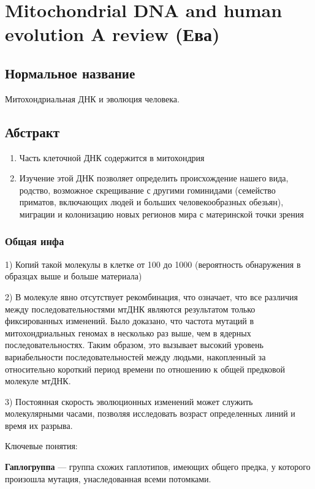 \section{Mitochondrial DNA and human evolution A review (Ева)}

\subsection{Нормальное название}

Митохондриальная ДНК и эволюция человека.

\subsection{Абстракт}

\begin{enumerate}
	\item Часть клеточной ДНК содержится в митохондрия 
	
	\item Изучение этой ДНК позволяет определить происхождение нашего вида, родство, возможное скрещивание с другими гоминидами (семейство приматов, включающих людей и больших человекообразных обезьян), миграции и колонизацию новых регионов мира с материнской точки зрения
\end{enumerate}

\subsubsection{Общая инфа}

1)	Копий такой молекулы в клетке от 100 до 1000 (вероятность обнаружения в образцах выше и больше материала)

2)	В молекуле явно отсутствует рекомбинация, что означает, что все различия между последовательностями мтДНК являются результатом только фиксированных изменений. Было доказано, что частота мутаций в митохондриальных геномах в несколько раз выше, чем в ядерных последовательностях. Таким образом, это вызывает высокий уровень вариабельности последовательностей между людьми, накопленный за относительно короткий период времени по отношению к общей предковой молекуле мтДНК.

3)	Постоянная скорость эволюционных изменений может служить молекулярными часами, позволяя исследовать возраст определенных линий и время их разрыва.

Ключевые понятия:

\textbf{Гаплогруппа} — группа схожих гаплотипов, имеющих общего предка, у которого произошла мутация, унаследованная всеми потомками.

